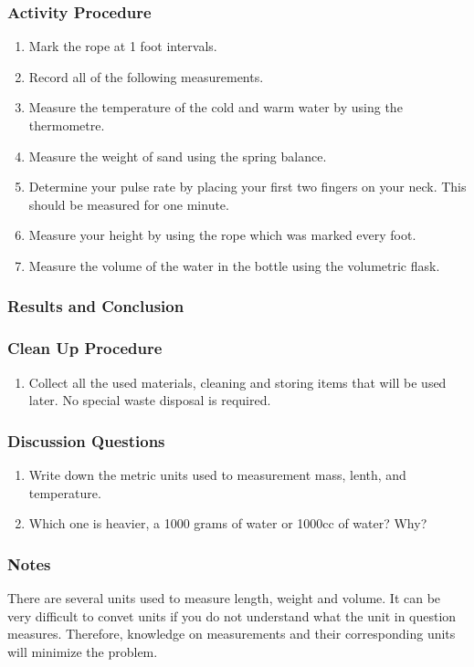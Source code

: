 \subsubsection*{Activity Procedure}
\begin{enumerate}
\item{Mark the rope at 1 foot intervals.}
\item{Record all of the following measurements.}
\item{Measure the temperature of the cold and warm water by using the thermometre.}
\item{Measure the weight of sand using the spring balance.}
\item{Determine your pulse rate by placing your first two fingers on your neck. This should be measured for one minute.}
\item{Measure your height by using the rope which was marked every foot.}
\item{Measure the volume of the water in the bottle using the volumetric flask.}
\end{enumerate}

\subsubsection*{Results and Conclusion}

\subsubsection*{Clean Up Procedure}
\begin{enumerate}
\item{Collect all the used materials, cleaning and storing items that will be used later. No special waste disposal is required.}
\end{enumerate}

\subsubsection*{Discussion Questions}
\begin{enumerate}
\item{Write down the metric units used to measurement mass, lenth, and temperature.}
\item{Which one is heavier, a 1000 grams of water or 1000cc of water? Why?}
\end{enumerate}

\subsubsection*{Notes}
There are several units used to measure length, weight and volume. It can be very difficult to convet units if you do not understand what the unit in question measures. Therefore, knowledge on measurements and their corresponding units will minimize the problem.